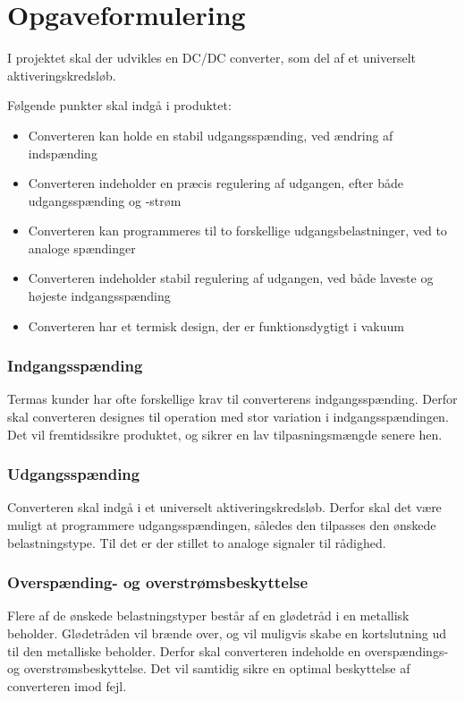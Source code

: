 

\section{Opgaveformulering}
I projektet skal der udvikles en DC/DC converter, som del af et universelt aktiveringskredsløb.   

\noindent Følgende punkter skal indgå i produktet:
\begin{itemize}
	\item Converteren kan holde en stabil udgangsspænding, ved ændring af indspænding
	\item Converteren indeholder en præcis regulering af udgangen, efter både udgangsspænding og -strøm
	\item Converteren kan programmeres til to forskellige udgangsbelastninger, ved to analoge spændinger
	\item Converteren indeholder stabil regulering af udgangen, ved både laveste og højeste indgangsspænding
	\item Converteren har et termisk design, der er funktionsdygtigt i vakuum 
\end{itemize}

\subsubsection*{Indgangsspænding}
\noindent Termas kunder har ofte forskellige krav til converterens indgangsspænding. Derfor skal converteren designes til operation med stor variation i indgangsspændingen. Det vil fremtidssikre produktet, og sikrer en lav tilpasningsmængde senere hen.  

\subsubsection*{Udgangsspænding}
\noindent Converteren skal indgå i et universelt aktiveringskredsløb. Derfor skal det være muligt at programmere udgangsspændingen, således den tilpasses den ønskede belastningstype. Til det er der stillet to analoge signaler til rådighed. 

\subsubsection*{Overspænding- og overstrømsbeskyttelse}
\noindent Flere af de ønskede belastningstyper består af en glødetråd i en metallisk beholder. Glødetråden vil brænde over, og vil muligvis skabe en kortslutning ud til den metalliske beholder. Derfor skal converteren indeholde en overspændings- og overstrømsbeskyttelse. Det vil samtidig sikre en optimal beskyttelse af converteren imod fejl.

